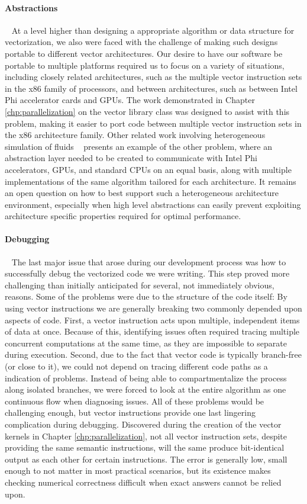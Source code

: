 \paragraph{Abstractions}~ At a level higher than designing a
appropriate algorithm or data structure for vectorization, we also
were faced with the challenge of making such designs portable to
different vector architectures. Our desire to have our software be
portable to multiple platforms required us to focus on a variety of
situations, including closely related architectures, such as the
multiple vector instruction sets in the x86 family of processors, and
between architectures, such as between Intel Phi accelerator cards and
GPUs. The work demonstrated in Chapter \ref{chp:parallelization} on
the vector library class was designed to assist with this problem,
making it easier to port code between multiple vector instruction sets
in the x86 architecture family. Other related work involving
heterogeneous simulation of fluids ~\citep{LiuMAS:2016} presents an
example of the other problem, where an abstraction layer needed to be
created to communicate with Intel Phi accelerators, GPUs, and standard
CPUs on an equal basis, along with multiple implementations of the
same algorithm tailored for each architecture. It remains an open
question on how to best support such a heterogeneous architecture
environment, especially when high level abstractions can easily
prevent exploiting architecture specific properties required for
optimal performance.

\paragraph{Debugging}~ The last major issue that arose during our
development process was how to successfully debug the vectorized code we were
writing. This step proved more challenging than initially anticipated
for several, not immediately obvious, reasons. Some of the problems were
due to the structure of the code itself: By using vector instructions
we are generally breaking two commonly depended upon aspects of
code. First, a vector instruction acts upon multiple, independent
items of data at once. Because of this, identifying issues often
required tracing multiple concurrent computations at the same time, as
they are impossible to separate during execution. Second, due to the
fact that vector code is typically branch-free (or close to it), we
could not depend on tracing different code paths as a indication of
problems. Instead of being able to compartmentalize the process along
isolated branches, we were forced to look at the entire algorithm as
one continuous flow when diagnosing issues. All of these problems
would be challenging enough, but vector instructions provide one last
lingering complication during debugging. Discovered during the
creation of the vector kernels in Chapter \ref{chp:parallelization},
not all vector instruction sets, despite providing the same semantic
instructions, will the same produce bit-identical output as each other
for certain instructions. The error is generally low, small enough to
not matter in most practical scenarios, but its existence makes
checking numerical correctness difficult when exact answers cannot be
relied upon.
 
